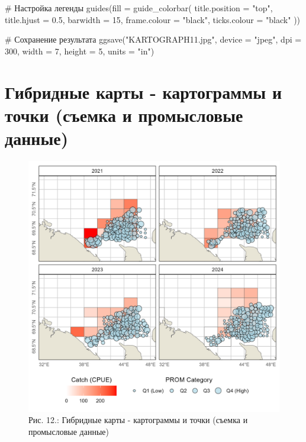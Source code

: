 \documentclass[
  letterpaper,
  DIV=11,
  numbers=noendperiod]{scrreprt}
\newenvironment{Shaded}{\begin{snugshade}}{\end{snugshade}}
\newcommand{\AttributeTok}[1]{\textcolor[rgb]{0.40,0.45,0.13}{#1}}
\newcommand{\CommentTok}[1]{\textcolor[rgb]{0.37,0.37,0.37}{#1}}
\newcommand{\DecValTok}[1]{\textcolor[rgb]{0.68,0.00,0.00}{#1}}
\newcommand{\FloatTok}[1]{\textcolor[rgb]{0.68,0.00,0.00}{#1}}
\newcommand{\FunctionTok}[1]{\textcolor[rgb]{0.28,0.35,0.67}{#1}}
\newcommand{\NormalTok}[1]{\textcolor[rgb]{0.00,0.23,0.31}{#1}}
\newcommand{\StringTok}[1]{\textcolor[rgb]{0.13,0.47,0.30}{#1}}
\begin{document}
\begin{Shaded}
\begin{Highlighting}[]
  \CommentTok{\# Настройка легенды}
  \FunctionTok{guides}\NormalTok{(}\AttributeTok{fill =} \FunctionTok{guide\_colorbar}\NormalTok{(}
    \AttributeTok{title.position =} \StringTok{"top"}\NormalTok{,}
    \AttributeTok{title.hjust =} \FloatTok{0.5}\NormalTok{,}
    \AttributeTok{barwidth =} \DecValTok{15}\NormalTok{,}
    \AttributeTok{frame.colour =} \StringTok{"black"}\NormalTok{,}
    \AttributeTok{ticks.colour =} \StringTok{"black"}
\NormalTok{  ))}

\CommentTok{\# Сохранение результата}
\FunctionTok{ggsave}\NormalTok{(}\StringTok{"KARTOGRAPH11.jpg"}\NormalTok{, }
       \AttributeTok{device =} \StringTok{"jpeg"}\NormalTok{, }
       \AttributeTok{dpi =} \DecValTok{300}\NormalTok{,}
       \AttributeTok{width =} \DecValTok{7}\NormalTok{,}
       \AttributeTok{height =} \DecValTok{5}\NormalTok{,}
       \AttributeTok{units =} \StringTok{"in"}\NormalTok{)}
\end{Highlighting}
\end{Shaded}

\section{Гибридные карты - картограммы и точки (съемка и промысловые
данные)}\label{ux433ux438ux431ux440ux438ux434ux43dux44bux435-ux43aux430ux440ux442ux44b---ux43aux430ux440ux442ux43eux433ux440ux430ux43cux43cux44b-ux438-ux442ux43eux447ux43aux438-ux441ux44aux435ux43cux43aux430-ux438-ux43fux440ux43eux43cux44bux441ux43bux43eux432ux44bux435-ux434ux430ux43dux43dux44bux435}

\begin{figure}[H]

{\centering \includegraphics[width=0.8\linewidth,height=\textheight,keepaspectratio]{images/KARTOGRAPH12.jpg}

}

\caption{Рис. 12.: Гибридные карты - картограммы и точки (съемка и
промысловые данные)}

\end{figure}%
\end{document}
